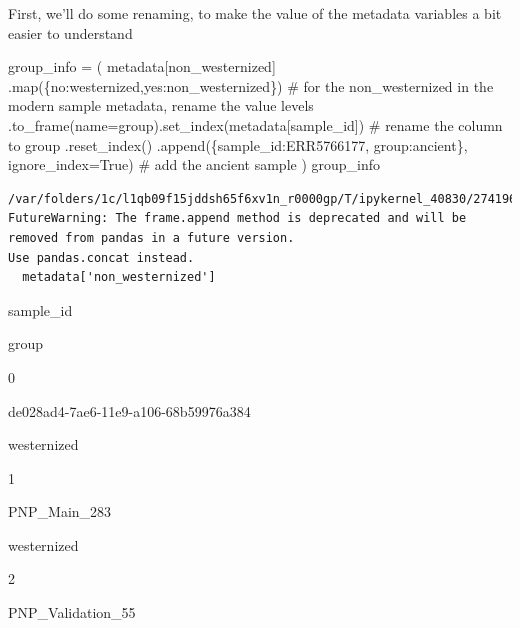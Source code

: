 \documentclass[
  letterpaper,
]{book}
\newenvironment{Shaded}{}{}
\newcommand{\BuiltInTok}[1]{\textcolor[rgb]{0.84,0.23,0.29}{#1}}
\newcommand{\CommentTok}[1]{\textcolor[rgb]{0.42,0.45,0.49}{#1}}
\newcommand{\NormalTok}[1]{\textcolor[rgb]{0.14,0.16,0.18}{#1}}
\newcommand{\OperatorTok}[1]{\textcolor[rgb]{0.14,0.16,0.18}{#1}}
\newcommand{\StringTok}[1]{\textcolor[rgb]{0.01,0.18,0.38}{#1}}
\newcommand{\VariableTok}[1]{\textcolor[rgb]{0.89,0.38,0.04}{#1}}
\begin{document}
First, we'll do some renaming, to make the value of the metadata
variables a bit easier to understand

\begin{Shaded}
\begin{Highlighting}[]
\NormalTok{group\_info }\OperatorTok{=}\NormalTok{ (}
\NormalTok{    metadata[}\StringTok{\textquotesingle{}non\_westernized\textquotesingle{}}\NormalTok{]}
\NormalTok{    .}\BuiltInTok{map}\NormalTok{(\{}\StringTok{\textquotesingle{}no\textquotesingle{}}\NormalTok{:}\StringTok{\textquotesingle{}westernized\textquotesingle{}}\NormalTok{,}\StringTok{\textquotesingle{}yes\textquotesingle{}}\NormalTok{:}\StringTok{\textquotesingle{}non\_westernized\textquotesingle{}}\NormalTok{\}) }\CommentTok{\# for the non\_westernized in the modern sample metadata, rename the value levels}
\NormalTok{    .to\_frame(name}\OperatorTok{=}\StringTok{\textquotesingle{}group\textquotesingle{}}\NormalTok{).set\_index(metadata[}\StringTok{\textquotesingle{}sample\_id\textquotesingle{}}\NormalTok{]) }\CommentTok{\# rename the column to group}
\NormalTok{    .reset\_index()}
\NormalTok{    .append(\{}\StringTok{\textquotesingle{}sample\_id\textquotesingle{}}\NormalTok{:}\StringTok{\textquotesingle{}ERR5766177\textquotesingle{}}\NormalTok{, }\StringTok{\textquotesingle{}group\textquotesingle{}}\NormalTok{:}\StringTok{\textquotesingle{}ancient\textquotesingle{}}\NormalTok{\}, ignore\_index}\OperatorTok{=}\VariableTok{True}\NormalTok{) }\CommentTok{\# add the ancient sample}
\NormalTok{)}
\NormalTok{group\_info}
\end{Highlighting}
\end{Shaded}

\begin{verbatim}
/var/folders/1c/l1qb09f15jddsh65f6xv1n_r0000gp/T/ipykernel_40830/27419655.py:2:
FutureWarning: The frame.append method is deprecated and will be removed from pandas in a future version.
Use pandas.concat instead.
  metadata['non_westernized']
\end{verbatim}

sample\_id

group

0

de028ad4-7ae6-11e9-a106-68b59976a384

westernized

1

PNP\_Main\_283

westernized

2

PNP\_Validation\_55
\end{document}
